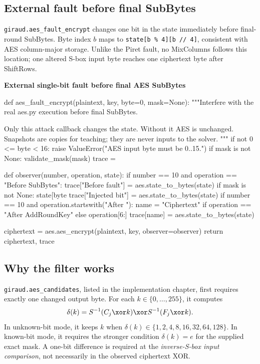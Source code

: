 \subsection{External fault before final SubBytes}
\texttt{giraud.aes\_\allowbreak{}fault\_\allowbreak{}encrypt} changes one bit in the state immediately before final-round SubBytes. Byte index $b$ maps to \texttt{state[b \% 4][b // 4]}, consistent with AES column-major storage. Unlike the Piret fault, no MixColumns follows this location; one altered S-box input byte reaches one ciphertext byte after ShiftRows.
\par\smallskip\noindent\textbf{External single-bit fault before final AES SubBytes}\par
\begin{lightcode}
def aes_fault_encrypt(plaintext, key, byte=0, mask=None):
    """Interfere with the real aes.py execution before final SubBytes.

    Only this attack callback changes the state. Without it AES is unchanged.
    Snapshots are copies for teaching; they are never inputs to the solver.
    """
    if not 0 <= byte < 16:
        raise ValueError("AES input byte must be 0..15.")
    if mask is not None:
        validate_mask(mask)
    trace = {}

    def observer(number, operation, state):
        if number == 10 and operation == "Before SubBytes":
            trace["Before fault"] = aes.state_to_bytes(state)
            if mask is not None:
                state[byte %
            trace["Injected bit"] = aes.state_to_bytes(state)
        if number == 10 and operation.startswith("After "):
            name = "Ciphertext" if operation == "After AddRoundKey" else operation[6:]
            trace[name] = aes.state_to_bytes(state)

    ciphertext = aes.aes_encrypt(plaintext, key, observer=observer)
    return ciphertext, trace
\end{lightcode}

\subsection{Why the filter works}
\texttt{giraud.aes\_\allowbreak{}candidates}, listed in the implementation chapter, first requires exactly one changed output byte. For each $k\in\{0,\ldots,255\}$, it computes
\[
\delta(k)=S^{-1}(C_j\xor k)\xor S^{-1}(F_j\xor k).
\]
In unknown-bit mode, it keeps $k$ when $\delta(k)\in\{1,2,4,8,16,32,64,128\}$. In known-bit mode, it requires the stronger condition $\delta(k)=e$ for the supplied exact mask. A one-bit difference is required at the \emph{inverse-S-box input comparison}, not necessarily in the observed ciphertext XOR.

